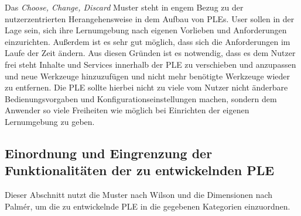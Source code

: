Das \emph{Choose, Change, Discard}\label{wilson_patterns:choose_change_discard} Muster steht in engem Bezug zu der nutzerzentrierten Herangehensweise in dem Aufbau von PLEs. User sollen in der Lage sein, sich ihre Lernumgebung nach eigenen Vorlieben und Anforderungen einzurichten. Außerdem ist es sehr gut möglich, dass sich die Anforderungen im Laufe der Zeit ändern. Aus diesen Gründen ist es notwendig, dass es dem Nutzer frei steht Inhalte und Services innerhalb der PLE zu verschieben und anzupassen und neue Werkzeuge hinzuzufügen und nicht mehr benötigte Werkzeuge wieder zu entfernen. Die PLE sollte hierbei nicht zu viele vom Nutzer nicht änderbare Bedienungsvorgaben und Konfigurationseinstellungen machen, sondern dem Anwender so viele Freiheiten wie möglich bei Einrichten der eigenen Lernumgebung zu geben.

\subsection{Einordnung und Eingrenzung der Funktionalitäten der zu entwickelnden PLE}
Dieser Abschnitt nutzt die Muster nach Wilson und die Dimensionen nach Palmér, um die zu entwickelnde PLE in die gegebenen Kategorien einzuordnen.
